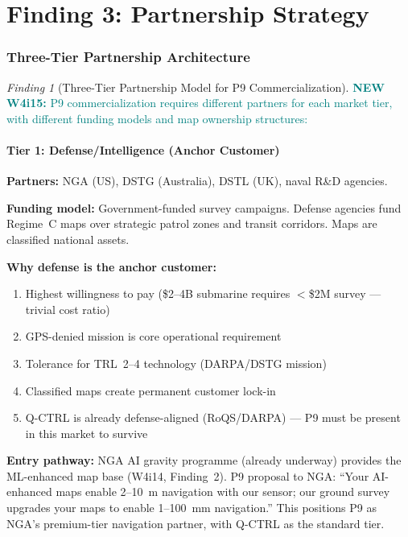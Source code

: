 \documentclass[11pt]{article}
\theoremstyle{definition}
\theoremstyle{remark}
\newtheorem{finding}[theorem]{Finding}
\newcommand{\newfinding}[1]{\textcolor{teal}{\textbf{NEW W4i15:} #1}}
\begin{document}
\part{Finding 3: Partnership Strategy}
\label{part:partnerships}

\section{Three-Tier Partnership Architecture}
\label{sec:partnership-tiers}

\begin{finding}[Three-Tier Partnership Model for P9 Commercialization]
\label{find:partnerships}
\newfinding{P9 commercialization requires different partners for each
market tier, with different funding models and map ownership structures:}

\subsection*{Tier 1: Defense/Intelligence (Anchor Customer)}

\textbf{Partners:} NGA (US), DSTG (Australia), DSTL (UK), naval R\&D
agencies.

\textbf{Funding model:} Government-funded survey campaigns.
Defense agencies fund Regime~C maps over strategic patrol zones and
transit corridors. Maps are classified national assets.

\textbf{Why defense is the anchor customer:}
\begin{enumerate}[nosep]
\item Highest willingness to pay (\$2--4B submarine requires
  $<$\$2M survey --- trivial cost ratio)
\item GPS-denied mission is core operational requirement
\item Tolerance for TRL~2--4 technology (DARPA/DSTG mission)
\item Classified maps create permanent customer lock-in
\item Q-CTRL is already defense-aligned (RoQS/DARPA) --- P9 must
  be present in this market to survive
\end{enumerate}

\textbf{Entry pathway:} NGA AI gravity programme (already underway)
provides the ML-enhanced map base (W4i14, Finding~2). P9 proposal
to NGA: ``Your AI-enhanced maps enable 2--10~m navigation with our
sensor; our ground survey upgrades your maps to enable 1--100~mm
navigation.'' This positions P9 as NGA's premium-tier navigation
partner, with Q-CTRL as the standard tier.


\end{finding}
\end{document}

